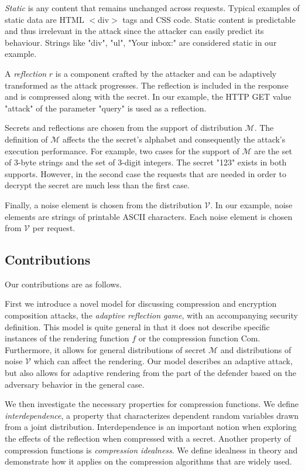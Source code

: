 \documentclass[conference, letterpaper, 10pt]{IEEEtran}
\begin{document}
\textit{Static} is any content that remains unchanged across requests. Typical
examples of static data are HTML $<$div$>$ tags and CSS code. Static content is
predictable and thus irrelevant in the attack since the attacker can easily
predict its behaviour. Strings like "div", "ul", "Your inbox:" are considered
static in our example.

A \textit{reflection} $r$ is a component crafted by the attacker and can be
adaptively transformed as the attack progresses. The reflection is included in
the response and is compressed along with the secret. In our example, the HTTP
GET value "attack" of the parameter "query" is used as a reflection.

Secrets and reflections are chosen from the support of distribution
$\mathcal{M}$. The definition of $\mathcal{M}$ affects the the secret's alphabet
and consequently the attack's execution performance. For example, two cases for
the support of $\mathcal{M}$ are the set of 3-byte strings and the set of
3-digit integers. The secret "123" exists in both supports. However, in the second
case the requests that are needed in order to decrypt the secret are much less
than the first case.

Finally, a noise element is chosen from the distribution $\mathcal{V}$. In our
example, noise elements are strings of printable ASCII characters. Each noise
element is chosen from $\mathcal{V}$ per request.

\subsection{Contributions}
Our contributions are as follows.

First we introduce a novel model for discussing compression and encryption
composition attacks, the \textit{adaptive reflection game}, with an accompanying
security definition. This model is quite general in that it does not describe
specific instances of the rendering function $f$ or the compression function
$\textrm{Com}$. Furthermore, it allows for general distributions of secret $\mathcal{M}$
and distributions of noise $\mathcal{V}$ which can affect the rendering. Our
model describes an adaptive attack, but also allows for adaptive rendering from
the part of the defender based on the adversary behavior in the general case.

We then investigate the necessary properties for compression functions. We
define \textit{interdependence}, a property that characterizes dependent random
variables drawn from a joint distribution. Interdependence is an important
notion when exploring the effects of the reflection when compressed with a
secret. Another property of compression functions is \textit{compression
idealness}. We define idealness in theory and demonstrate how it applies on the
compression algorithms that are widely used.
\end{document}
